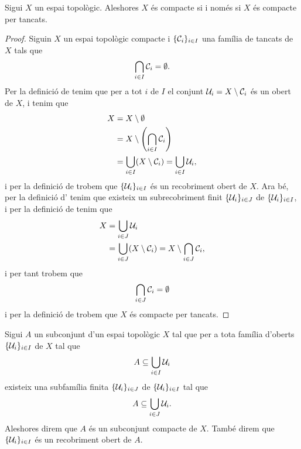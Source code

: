 \documentclass[../../Main.tex]{subfiles}
\begin{document}
	\begin{proposition}
		\label{prop:compacte si i només si compacte per tancats}
		\label{prop:equivalència entre compacitat i compacitat per tancats}
		Sigui \(X\) un espai topològic. Aleshores \(X\) és compacte si i només si \(X\) és compacte per tancats.
		\begin{proof}
			Siguin \(X\) un espai topològic compacte i \(\{\mathcal{C}_{i}\}_{i\in I}\) una família de tancats de \(X\) tals que
			\[
			    \bigcap_{i\in I}\mathcal{C}_{i}=\emptyset.
			\]
			Per la definició de  tenim que per a tot \(i\) de \(I\) el conjunt \(\mathcal{U}_{i}=X\setminus\mathcal{C}_{i}\) és un obert de \(X\), i tenim que
			\begin{align*}
				X&=X\setminus\emptyset \\
				&=X\setminus\left(\bigcap_{i\in I}\tancat{C}_{i}\right) \\
				&=\bigcup_{i\in I}(X\setminus\tancat{C}_{i})=\bigcup_{i\in I}\obert{U}_{i},
			\end{align*}
			i per la definició de  trobem que \(\{\mathcal{U}_{i}\}_{i\in I}\) és un recobriment obert de \(X\). Ara bé, per la definició d' tenim que existeix un subrecobriment finit \(\{\mathcal{U}_{i}\}_{i\in J}\) de \(\{\mathcal{U}_{i}\}_{i\in I}\), i per la definició de  tenim que
			\begin{align*}
				X&=\bigcup_{i\in J}\mathcal{U}_{i} \\
				&=\bigcup_{i\in J}(X\setminus\mathcal{C}_{i})=X\setminus\bigcap_{i\in J}\mathcal{C}_{i},
			\end{align*} %
			i per tant trobem que
			\[
			    \bigcap_{i\in J}\mathcal{C}_{i}=\emptyset
			\]
			i per la definició de  trobem que \(X\) és compacte per tancats.
		\end{proof}
	\end{proposition}
	\begin{definition}
		\label{def:compacitat d'un subconjunt}
		\label{def:subconjunt compacte}
		\label{def:recobriment obert d'un subconjunt}
		Sigui \(A\) un subconjunt d'un espai topològic \(X\) tal que per a tota família d'oberts \(\{\mathcal{U}_{i}\}_{i\in I}\) de \(X\) tal que
		\[
		    A\subseteq\bigcup_{i\in I}\mathcal{U}_{i}
		\]
		existeix una subfamília finita \(\{\mathcal{U}_{i}\}_{i\in J}\) de \(\{\mathcal{U}_{i}\}_{i\in I}\) tal que
		\[
		    A\subseteq\bigcup_{i\in J}\mathcal{U}_{i}.
		\]
		Aleshores direm que \(A\) és un subconjunt compacte de \(X\). També direm que \(\{\mathcal{U}_{i}\}_{i\in I}\) és un recobriment obert de \(A\).
	\end{definition}
\end{document}
